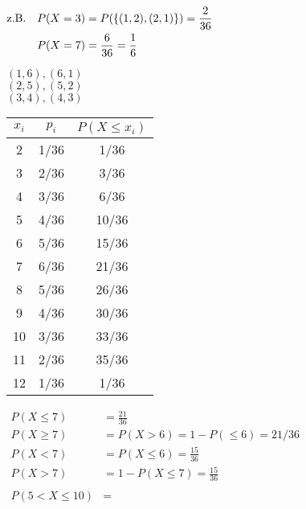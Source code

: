 $\begin{aligned}
\text{z.B.} \quad & P(X = 3) = P(\{(1,2), (2,1)\}) = \frac{2}{36}\\
						& P(X = 7) = \frac{6}{36} = \frac{1}{6}
\end{aligned}$

$(1,6) , (6,1)$\\
$(2,5), (5,2) $\\
$(3,4), (4,3)$ \\

\begin{tabular}{c | c | c}
$x_i$	&	$p_i$	&	$P(X \le x_i)$ \\
\hline
	2		&	1/36	&			1/36			\\
	3		&	2/36	&			3/36			\\	
	4		&	3/36	&			6/36			\\	
	5		&	4/36	&		 10/36			\\	
	6		&	5/36	&		 15/36			\\	
	7		&	6/36	&		 21/36			\\	
	8		&	5/36	&		 26/36			\\	
	9		&	4/36	&		 30/36			\\	
	10	&	3/36	&		 33/36			\\	
	11	&	2/36	&		 35/36			\\	
	12	&	1/36	&		  1/36			\\	
\end{tabular}
%
$\begin{aligned}
	P(X \leq 7) &= \frac{21}{36} \\
	P(X \geq 7) &= P(X > 6) = 1 - P(\leq 6) =  21/36 \\
	P(X < 7) &= P(X \leq 6) = \frac{15}{36} \\
	P(X > 7) &= 1 - P(X \leq 7) = \frac{15}{36} \\
	\\
	P(5 < X \leq 10) &= 
\end{aligned}$
